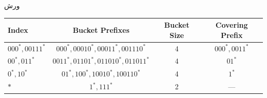 \documentclass[paper=a4, fontsize=11pt]{article}
\numberwithin{equation}{section} %
\numberwithin{figure}{section} %
\numberwithin{table}{section} %
\begin{document}
\par
ورش 

\begin{center}
\begin{latin}
\begin{tabular}{ l  c  c  c }
    \hline
    Index & Bucket Prefixes & Bucket Size & Covering Prefix \\
    \hline
    $000^*, 00111^*$ & $000^*, 00010^*, 00011^*, 001110^*$ & 4 & $000^*, 0011^*$ \\
    $00^*, 011^*$ & $0011^*, 01101^*, 011010^*, 011011^*$ & 4 & $01^*$ \\
    $0^*, 10^*$ & $01^*, 100^*, 10010^*, 100110^*$ & 4 & $1^*$ \\
    $*$ & $1^*, 111^*$ & 2 & --- \\
    \hline
\end{tabular}
\end{latin}
\end{center}
\end{document}
